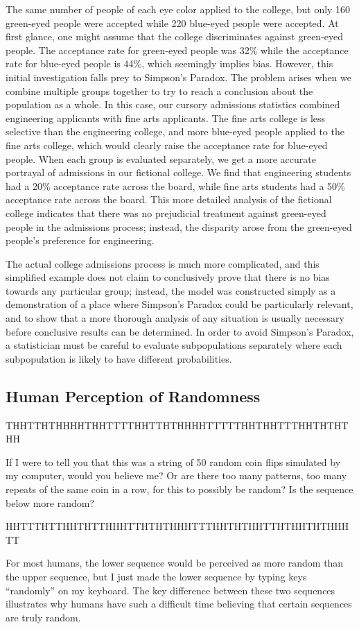 The same number of people of each eye color applied to the college, but only 160 green-eyed people were accepted while 220 blue-eyed people were accepted. At first glance, one might assume that the college discriminates against green-eyed people. The acceptance rate for green-eyed people was 32\% while the acceptance rate for blue-eyed people is 44\%, which seemingly implies bias. However, this initial investigation falls prey to Simpson’s Paradox. The problem arises when we combine multiple groups together to try to reach a conclusion about the population as a whole. In this case, our cursory admissions statistics combined engineering applicants with fine arts applicants. The fine arts college is less selective than the engineering college, and more blue-eyed people applied to the fine arts college, which would clearly raise the acceptance rate for blue-eyed people. When each group is evaluated separately, we get a more accurate portrayal of admissions in our fictional college. We find that engineering students had a 20\% acceptance rate across the board, while fine arts students had a 50\% acceptance rate across the board. This more detailed analysis of the fictional college indicates that there was no prejudicial treatment against green-eyed people in the admissions process; instead, the disparity arose from the green-eyed people’s preference for engineering.

The actual college admissions process is much more complicated, and this simplified example does not claim to conclusively prove that there is no bias towards any particular group; instead, the model was constructed simply as a demonstration of a place where Simpson’s Paradox could be particularly relevant, and to show that a more thorough analysis of any situation is usually necessary before conclusive results can be determined. In order to avoid Simpson’s Paradox, a statistician must be careful to evaluate subpopulations separately where each subpopulation is likely to have different probabilities.

\subsection*{Human Perception of Randomness}

\begin{center}
    THHTTHTHHHHTHHTTTTHHTTHTHHHHTTTTTHHTHHTTTHHTHTHTHH
\end{center}
If I were to tell you that this was a string of 50 random coin flips simulated by my computer, would you believe me? Or are there too many patterns, too many repeats of the same coin in a row, for this to possibly be random? Is the sequence below more random?
\begin{center}
    HHTTTHTTHHTHTTHHHTTHTHTHHHTTTHHTHTHHTTHTHHTHTHHHTT
\end{center}
For most humans, the lower sequence would be perceived as more random than the upper sequence, but I just made the lower sequence by typing keys “randomly” on my keyboard. The key difference between these two sequences illustrates why humans have such a difficult time believing that certain sequences are truly random.

